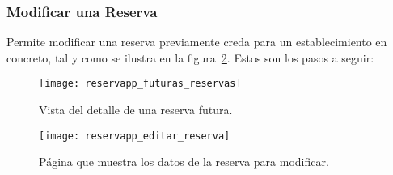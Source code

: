 \subsubsection{Modificar una Reserva}
Permite modificar una reserva previamente creda para un establecimiento en concreto, tal y como se ilustra en la figura~\ref{fig:reservapp_editar_reserva}. Estos son los pasos a seguir:

\begin{figure}[H]
	\centering
		\texttt{[image: reservapp\_futuras\_reservas]}
	\caption{Vista del detalle de una reserva futura.}
	\label{fig:reservapp_futuras_reservas}
\end{figure}

\begin{figure}[H]
	\centering
		\texttt{[image: reservapp\_editar\_reserva]}
	\caption{Página que muestra los datos de la reserva para modificar.}
	\label{fig:reservapp_editar_reserva}
\end{figure}

